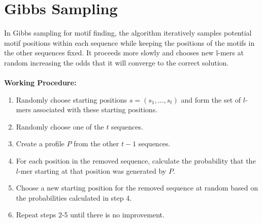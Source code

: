 \documentclass{report}
\begin{document}
\section{Gibbs Sampling}
In Gibbs sampling for motif finding, the algorithm iteratively samples potential motif positions within each sequence while keeping the positions of the motifs in the other sequences fixed. It proceeds more slowly and chooses new l-mers at random increasing the odds that it will converge to the correct solution.
\\\\
\textbf{Working Procedure:}
\begin{enumerate}
    \item Randomly choose starting positions $s = (s_1,\ldots,s_t)$ and form the set of $l$-mers associated with these starting positions.
    \item Randomly choose one of the $t$ sequences.
    \item Create a profile $P$ from the other $t - 1$ sequences.
    \item For each position in the removed sequence, calculate the probability that the $l$-mer starting at that position was generated by $P$.
    \item Choose a new starting position for the removed sequence at random based on the probabilities calculated in step 4.
    \item Repeat steps 2-5 until there is no improvement.
\end{enumerate}
\end{document}
